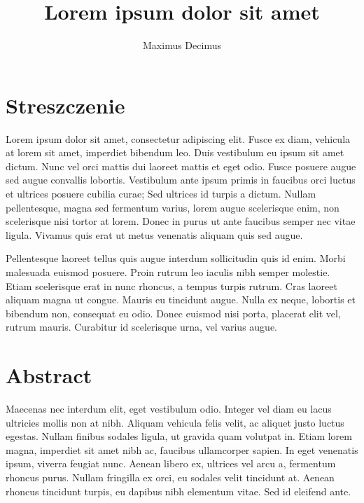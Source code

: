 \documentclass[polish,engineering]{wizthesis}
\author{Maximus Decimus}
\title{Lorem ipsum dolor sit amet}
\begin{document}
\frontmatter %

\maketitle

\chapter*{Streszczenie}

Lorem ipsum dolor sit amet, consectetur adipiscing elit. Fusce ex diam, vehicula at lorem sit amet, imperdiet bibendum leo. Duis vestibulum eu ipsum sit amet dictum. Nunc vel orci mattis dui laoreet mattis et eget odio. Fusce posuere augue sed augue convallis lobortis.
Vestibulum ante ipsum primis in faucibus orci luctus et ultrices posuere cubilia curae; Sed ultrices id turpis a dictum. Nullam pellentesque, magna sed fermentum varius, lorem augue scelerisque enim, non scelerisque nisi tortor at lorem. Donec in purus ut ante faucibus semper nec vitae ligula. Vivamus quis erat ut metus venenatis aliquam quis sed augue.

Pellentesque laoreet tellus quis augue interdum sollicitudin quis id enim. Morbi malesuada euismod posuere. Proin rutrum leo iaculis nibh semper molestie. Etiam scelerisque erat in nunc rhoncus, a tempus turpis rutrum.
Cras laoreet aliquam magna ut congue. Mauris eu tincidunt augue. Nulla ex neque, lobortis et bibendum non, consequat eu odio. Donec euismod nisi porta, placerat elit vel, rutrum mauris. Curabitur id scelerisque urna, vel varius augue.

{\let\clearpage\relax\chapter*{Abstract}} %

Maecenas nec interdum elit, eget vestibulum odio. Integer vel diam eu lacus ultricies mollis non at nibh. Aliquam vehicula felis velit, ac aliquet justo luctus egestas. Nullam finibus sodales ligula, ut gravida quam volutpat in. Etiam lorem magna, imperdiet sit amet nibh ac, faucibus ullamcorper sapien. In eget venenatis ipsum, viverra feugiat nunc.
Aenean libero ex, ultrices vel arcu a, fermentum rhoncus purus. Nullam fringilla ex orci, eu sodales velit tincidunt at. Aenean rhoncus tincidunt turpis, eu dapibus nibh elementum vitae. Sed id eleifend ante.
\end{document}
